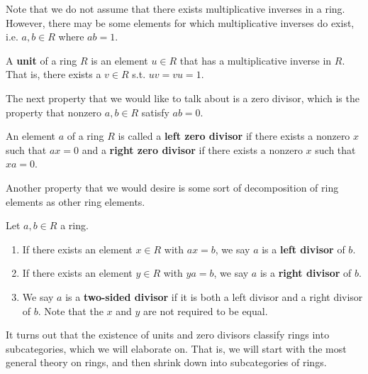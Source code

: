   Note that we do not assume that there exists multiplicative inverses in a ring. However, there may be some elements for which multiplicative inverses do exist, i.e. $a, b \in R$ where $ab = 1$.  

  \begin{definition}[Unit]
    A \textbf{unit} of a ring $R$ is an element $u \in R$ that has a multiplicative inverse in $R$. That is, there exists a $v \in R$ s.t. $uv = vu = 1$. 
  \end{definition}

  The next property that we would like to talk about is a zero divisor, which is the property that nonzero $a, b \in R$ satisfy $ab = 0$. 

  \begin{definition}
    An element $a$ of a ring $R$ is called a \textbf{left zero divisor} if there exists a nonzero $x$ such that $a x = 0$ and a \textbf{right zero divisor} if there exists a nonzero $x$ such that $x a = 0$. 
  \end{definition} 

  Another property that we would desire is some sort of decomposition of ring elements as other ring elements. 

  \begin{definition}
    Let $a, b \in R$ a ring. 
    \begin{enumerate}
      \item If there exists an element $x \in R$ with $ax = b$, we say $a$ is a \textbf{left divisor} of $b$. 

      \item If there exists an element $y \in R$ with $ya = b$, we say $a$ is a \textbf{right divisor} of $b$. 

      \item We say $a$ is a \textbf{two-sided divisor} if it is both a left divisor and a right divisor of $b$. Note that the $x$ and $y$ are not required to be equal. 
    \end{enumerate}
  \end{definition}

  It turns out that the existence of units and zero divisors classify rings into subcategories, which we will elaborate on. That is, we will start with the most general theory on rings, and then shrink down into subcategories of rings. 

